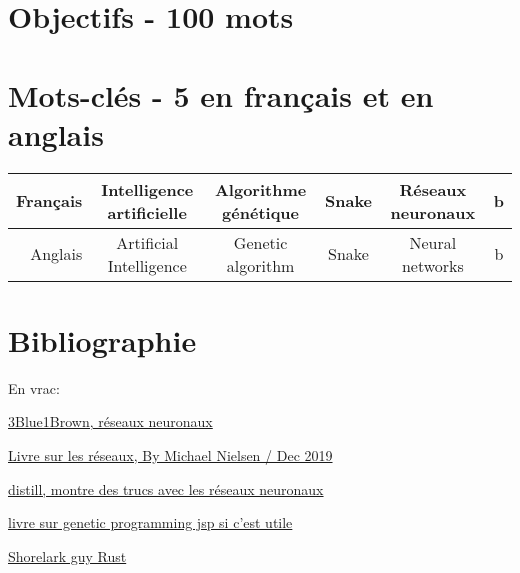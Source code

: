 \documentclass[11pt,a4paper]{article}
\begin{document}
\section{Objectifs - 100 mots}


\section{Mots-clés - 5 en français et en anglais}

\begin{tabular}{||r|c|c|c|c|c||} \hline
	Français & Intelligence artificielle & Algorithme génétique & Snake & Réseaux neuronaux & b \\ \hline \hline
	Anglais & Artificial Intelligence & Genetic algorithm & Snake & Neural networks & b \\
		\hline
	\end{tabular}

\section{Bibliographie}

En vrac:

\href{https://www.3blue1brown.com/topics/neural-networks}{3Blue1Brown, réseaux neuronaux}

\href{http://neuralnetworksanddeeplearning.com/index.html}{Livre sur les réseaux, By Michael Nielsen / Dec 2019}

\href{https://distill.pub}{distill, montre des trucs avec les réseaux neuronaux}

\href{http://www0.cs.ucl.ac.uk/staff/W.Langdon/ftp/papers/poli08_fieldguide.pdf}{livre sur genetic programming jsp si c'est utile}

\href{https://pwy.io/posts/learning-to-fly-pt1/}{Shorelark guy Rust}
\end{document}
